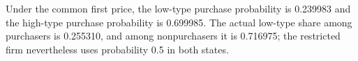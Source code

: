 Under the common first price, the low-type purchase probability is 0.239983 and the high-type purchase probability is 0.699985. The actual low-type share among purchasers is 0.255310, and among nonpurchasers it is 0.716975; the restricted firm nevertheless uses probability 0.5 in both states.
